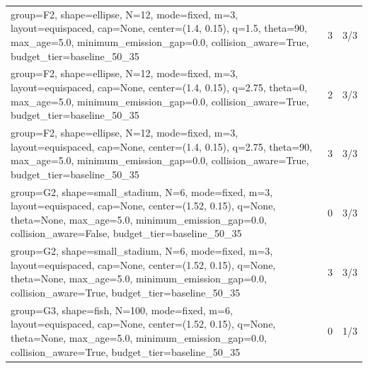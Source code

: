 \begin{tabular}{p{11cm}rr}
group=F2, shape=ellipse, N=12, mode=fixed, m=3, layout=equispaced, cap=None, center=(1.4, 0.15), q=1.5, theta=90, max\_age=5.0, minimum\_emission\_gap=0.0, collision\_aware=True, budget\_tier=baseline\_50\_35 & 3 & 3/3 \\
group=F2, shape=ellipse, N=12, mode=fixed, m=3, layout=equispaced, cap=None, center=(1.4, 0.15), q=2.75, theta=0, max\_age=5.0, minimum\_emission\_gap=0.0, collision\_aware=True, budget\_tier=baseline\_50\_35 & 2 & 3/3 \\
group=F2, shape=ellipse, N=12, mode=fixed, m=3, layout=equispaced, cap=None, center=(1.4, 0.15), q=2.75, theta=90, max\_age=5.0, minimum\_emission\_gap=0.0, collision\_aware=True, budget\_tier=baseline\_50\_35 & 3 & 3/3 \\
group=G2, shape=small\_stadium, N=6, mode=fixed, m=3, layout=equispaced, cap=None, center=(1.52, 0.15), q=None, theta=None, max\_age=5.0, minimum\_emission\_gap=0.0, collision\_aware=False, budget\_tier=baseline\_50\_35 & 0 & 3/3 \\
group=G2, shape=small\_stadium, N=6, mode=fixed, m=3, layout=equispaced, cap=None, center=(1.52, 0.15), q=None, theta=None, max\_age=5.0, minimum\_emission\_gap=0.0, collision\_aware=True, budget\_tier=baseline\_50\_35 & 3 & 3/3 \\
group=G3, shape=fish, N=100, mode=fixed, m=6, layout=equispaced, cap=None, center=(1.52, 0.15), q=None, theta=None, max\_age=5.0, minimum\_emission\_gap=0.0, collision\_aware=True, budget\_tier=baseline\_50\_35 & 0 & 1/3 \\
\end{tabular}
